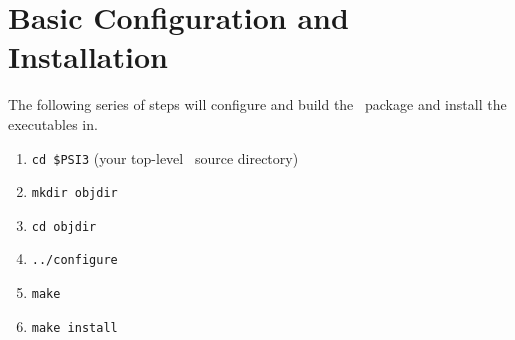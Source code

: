 \documentclass[12pt]{article}
\begin{document}
\section{Basic Configuration and Installation}

The following series of steps will configure and build the \PSIthree\
package and install the executables in.

\begin{enumerate}
\item {\tt cd \$PSI3} (your top-level \PSIthree\ source directory)
\item {\tt mkdir objdir}
\item {\tt cd objdir}
\item {\tt ../configure}
\item {\tt make}
\item {\tt make install}
\end{enumerate}
\end{document}
